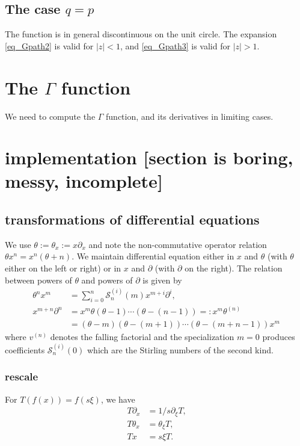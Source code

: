 \documentclass[12pt]{article}
\numberwithin{equation}{section}
\begin{document}
\subsection{The case $q=p$}
The function is in general discontinuous on the unit circle. The expansion \eqref{eq_Gpath2} is valid for $|z| < 1$, and \eqref{eq_Gpath3} is valid for $|z| > 1$.

\section{The $\Gamma$ function}
We need to compute the $\Gamma$ function, and its derivatives in limiting cases.

\section{implementation [section is boring, messy, incomplete]}

\subsection{transformations of differential equations}
We use $\theta := \theta_x := x \partial_x$ and note the non-commutative operator relation $\theta x^n = x^n (\theta+n)$. We maintain differential equation either in $x$ and $\theta$ (with $\theta$ either on the left or right) or in $x$ and $\partial$ (with $\partial$ on the right). The relation between powers of $\theta$ and powers of $\partial$ is given by
\begin{align*}
\theta^n x^m &= \sum_{i=0}^{n} \mathcal{S}_{n}^{(i)}(m) x^{m+i} \partial^i\text{,}\\
x^{m+n} \partial^n &= x^m \theta (\theta-1)\cdots(\theta-(n-1)) =:x^m \theta^{(n)}\\
&= (\theta-m)(\theta-(m+1))\cdots(\theta-(m+n-1))x^m
\end{align*}
where $v^{(n)}$ denotes the falling factorial and the specialization $m=0$ produces coefficients $\mathcal{S}_{n}^{(i)}(0)$ which are the Stirling numbers of the second kind.

\subsubsection{rescale}
For $T(f(x)) = f(s \xi)$, we have
\begin{align*}
T \partial_x &= 1/s \partial_{\xi} T\text{,}\\
T \theta_x &= \theta_{\xi} T \text{,}\\
T x &= s \xi T\text{.}
\end{align*}
\end{document}
